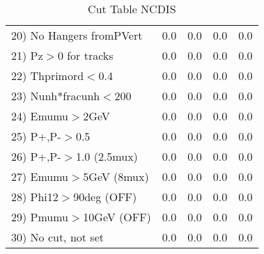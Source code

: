 \begin{table}[h!]
\begin{tabular}{||l||r|r|r|r||}
 20) No Hangers fromPVert &         0.0 &         0.0 &         0.0 &         0.0 \\
 21) Pz$>$0 for tracks    &         0.0 &         0.0 &         0.0 &         0.0 \\
 22) Thprimord$<$0.4      &         0.0 &         0.0 &         0.0 &         0.0 \\
 23) Nunh*fracunh$<$200   &         0.0 &         0.0 &         0.0 &         0.0 \\
 24) Emumu$>$2GeV         &         0.0 &         0.0 &         0.0 &         0.0 \\
 25) P+,P-$>$0.5          &         0.0 &         0.0 &         0.0 &         0.0 \\
 26) P+,P-$>$1.0 (2.5mux) &         0.0 &         0.0 &         0.0 &         0.0 \\
 27) Emumu$>$5GeV  (8mux) &         0.0 &         0.0 &         0.0 &         0.0 \\
 28) Phi12$>$90deg  (OFF) &         0.0 &         0.0 &         0.0 &         0.0 \\
 29) Pmumu$>$10GeV  (OFF) &         0.0 &         0.0 &         0.0 &         0.0 \\
 30) No cut, not set      &         0.0 &         0.0 &         0.0 &         0.0 \\
 \hline
 \hline
 \end{tabular}
 \caption{Cut Table  NCDIS  }
 \label{tab-cut_ncdis}
 \end{table}
